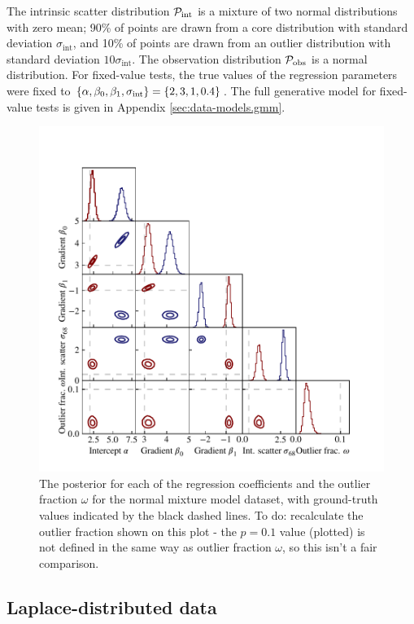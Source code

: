 \documentclass[fleqn,usenatbib]{mnras}
\begin{document}
The intrinsic scatter distribution $\mathcal P_{\rm int}$ is a mixture of two
normal distributions with zero mean; 90\% of points are drawn from a core
distribution with standard deviation $\sigma_\textrm{int}$, and 10\% of points
are drawn from an outlier distribution with standard deviation $10
\sigma_\textrm{int}$. The observation distribution $\mathcal P_{\rm obs}$ is a
normal distribution. For fixed-value tests, the true values of the regression
parameters were fixed to $\{\alpha, \beta_0, \beta_1, \sigma_{\rm int}\} = \{2,
3, 1, 0.4\}$. The full generative model for fixed-value tests is given in
Appendix \ref{sec:data-models.gmm}.

\begin{figure}
    \includegraphics[width=\columnwidth]{graphics/corner_gaussian_mix.pdf}
    \caption{The posterior for each of the regression coefficients and the
    outlier fraction $\omega$ for the normal mixture model dataset, with
    ground-truth values indicated by the black dashed lines. {\color{red} To do:
    recalculate the outlier fraction shown on this plot - the $p = 0.1$ value
    (plotted) is not defined in the same way as outlier fraction $\omega$, so
    this isn't a fair comparison.}}
    \label{fig:results.gmm.corner}
\end{figure}

\subsection{Laplace-distributed data}
\label{sec:results.laplace}
\end{document}

